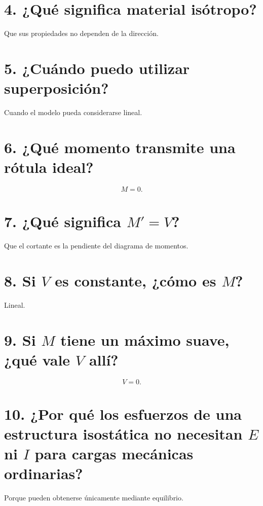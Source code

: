 \section*{4. ¿Qué significa material isótropo?}
Que sus propiedades no dependen de la dirección.

\section*{5. ¿Cuándo puedo utilizar superposición?}
Cuando el modelo pueda considerarse lineal.

\section*{6. ¿Qué momento transmite una rótula ideal?}
\[
\boxed{M=0}.
\]

\section*{7. ¿Qué significa $M'=V$?}
Que el cortante es la pendiente del diagrama de momentos.

\section*{8. Si $V$ es constante, ¿cómo es $M$?}
Lineal.

\section*{9. Si $M$ tiene un máximo suave, ¿qué vale $V$ allí?}
\[
\boxed{V=0}.
\]

\section*{10. ¿Por qué los esfuerzos de una estructura isostática no necesitan $E$ ni $I$ para cargas mecánicas ordinarias?}
Porque pueden obtenerse únicamente mediante equilibrio.

